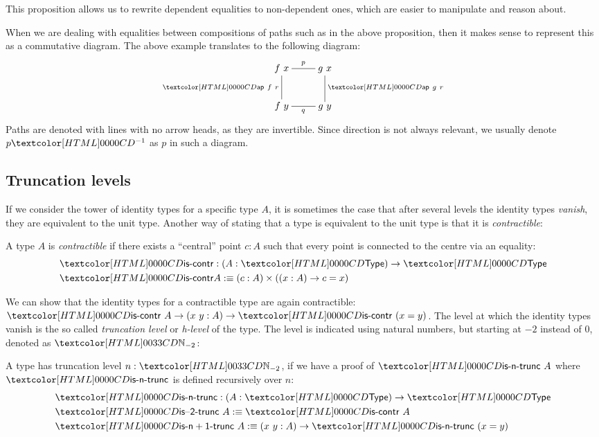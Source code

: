 This proposition allows us to rewrite dependent equalities to
non-dependent ones, which are easier to manipulate and reason about.

\begin{remark}
  When we are dealing with equalities between compositions of paths
  such as in the above proposition, then it makes sense to represent
  this as a commutative diagram. The above example translates to the
  following diagram:
  $$
  \xymatrix{
    f\ x 
    \ar@{-}[r]^{p}
    \ar@{-}[d]_{\ap\ f\ r}
    &g\ x
    \ar@{-}[d]^{\ap\ g\ r}
    \\
    f\ y
    \ar@{-}[r]_{q}
    &g\ y
  }
  $$
  Paths are denoted with lines with no arrow heads, as they are
  invertible. Since direction is not always relevant, we usually
  denote $\sym{p}$ as $p$ in such a diagram.
\end{remark}

\subsection{Truncation levels}

If we consider the tower of identity types for a specific type $A$, it
is sometimes the case that after several levels the identity types
\emph{vanish}, \ie they are equivalent to the unit type. Another way
of stating that a type is equivalent to the unit type is that it is
\emph{contractible}:

\begin{definition}
  A type $A$ is \emph{contractible} if there exists a ``central''
  point $c : A$ such that every point is connected to the centre via
  an equality:
  \begin{align*}
    &\iscontr : (A : \Type) \to \Type \\
    &\iscontr A \ddefeq (c : A) \times ((x : A) \to c = x)
  \end{align*}
\end{definition}

We can show that the identity types for a contractible type are again
contractible: $\iscontr\ A \to (x\ y : A) \to \iscontr\ (x = y)$. The
level at which the identity types vanish is the so called
\emph{truncation level} or \emph{h-level} of the type. The level is
indicated using natural numbers, but starting at $-2$ instead of $0$,
denoted as $\natty_{-2}$:

\begin{definition}
  A type has truncation level $n : \natty_{-2}$, if we have a proof of
  $\istrunc{n}\ A$ where $\istrunc{n}$ is defined recursively over $n$:
  \begin{align*}
    &\istrunc{n} : (A : \Type) \to \Type \\
    &\istrunc{-2}\ A \ddefeq \iscontr\ A \\
    &\istrunc{n+1}\ A \ddefeq (x\ y : A) \to \istrunc{n}\ (x = y)
  \end{align*}
\end{definition}

